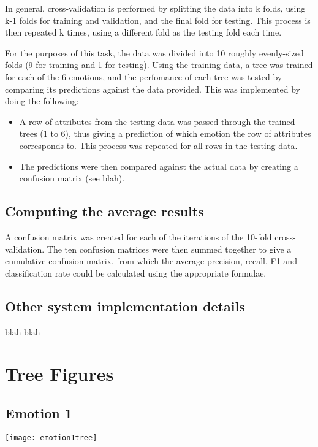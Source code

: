 \documentclass[a4paper,11pt]{article}
\begin{document}
In general, cross-validation is performed by splitting the data into k folds, using k-1 folds for training and validation, and the final fold for testing. This process is then repeated k times, using a different fold as the testing fold each time.

For the purposes of this task, the data was divided into 10 roughly evenly-sized folds (9 for training and 1 for testing). Using the training data, a tree was trained for each of the 6 emotions, and the perfomance of each tree was tested by comparing its predictions against the data provided. This was implemented by doing the following:

\begin{itemize}
	\item A row of attributes from the testing data was passed through the trained trees (1 to 6), thus giving a prediction of which emotion the row of attributes corresponds to. This process was repeated for all rows in the testing data.
	\item The predictions were then compared against the actual data by creating a confusion matrix (see blah).
\end{itemize}

\subsection{Computing the average results}

A confusion matrix was created for each of the iterations of the 10-fold cross-validation. The ten confusion matrices were then summed together to give a cumulative confusion matrix, from which the average precision, recall, F1 and classification rate could be calculated using the appropriate formulae.

\subsection{Other system implementation details}

blah blah 

\section{Tree Figures}

\subsection{Emotion 1}

\texttt{[image: emotion1tree]}
\end{document}
